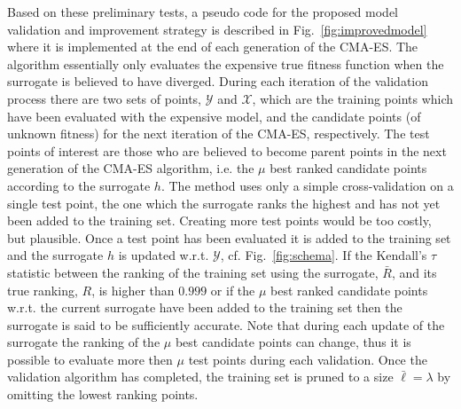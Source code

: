 \documentclass[conference]{IEEEtran}
\begin{document}
Based on these preliminary tests, a pseudo code for the proposed model validation and improvement strategy is described in Fig.~\ref{fig:improvedmodel} where it is implemented at the end of each generation of the CMA-ES. The algorithm essentially only evaluates the expensive true fitness function when the surrogate is believed to have diverged. During each iteration of the validation process there are two sets of points, $\mathcal{Y}$ and $\mathcal{X}$, which are the training points which have been evaluated with the expensive model, and the candidate points (of unknown fitness) for the next iteration of the CMA-ES, respectively. The test points of interest are those who are believed to become parent points in the next generation of the CMA-ES algorithm, i.e. the $\mu$ best ranked candidate points according to the surrogate $h$. The method uses only a simple cross-validation on a single test point, the one which the surrogate ranks the highest and has not yet been added to the training set. Creating more test points would be too costly, but plausible. Once a test point has been evaluated it is added to the training set and the surrogate $h$ is updated w.r.t. $\mathcal{Y}$, cf. Fig.~\ref{fig:schema}. If the Kendall's $\tau$ statistic between the ranking of the training set using the surrogate, $\bar{R}$, and its true ranking, $R$, is higher than $0.999$ or if the $\mu$ best ranked candidate points w.r.t. the current surrogate have been added to the training set then the surrogate is said to be sufficiently accurate. Note that during each update of the surrogate the ranking of the $\mu$ best candidate points can change, thus it is possible to evaluate more then $\mu$ test points during each validation. Once the validation algorithm has completed, the training set is pruned to a size $\bar{\ell}=\lambda$ by omitting the lowest ranking points. 
\end{document}
